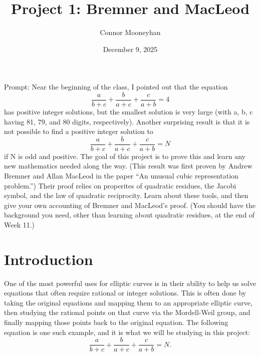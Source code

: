 \documentclass[12pt]{article}
\title{Project 1: Bremner and MacLeod}
\author{Connor Mooneyhan}
\date{December 9, 2025}
\theoremstyle{definition}
\begin{document}
\maketitle

Prompt: Near the beginning of the class, I pointed out that the equation \begin{equation*}
	\frac{a}{b+c}+ \frac{b}{a+c} + \frac{c}{a+b} = 4
\end{equation*} has positive integer solutions, but the smallest solution is very large (with a, b, c having 81, 79, and 80 digits, respectively).
Another surprising result is that it is not possible to find a positive integer solution to \begin{equation*}
	\frac{a}{b+c}+ \frac{b}{a+c} + \frac{c}{a+b} = N
\end{equation*} if N is odd and positive.
The goal of this project is to prove this and learn any new mathematics needed along the way.
(This result was first proven by Andrew Bremner and Allan MacLeod in the paper ``An unusual cubic representation problem.'')
Their proof relies on properites of quadratic residues, the Jacobi symbol, and the law of quadratic reciprocity.
Learn about these tools, and then give your own accounting of Bremner and MacLeod’s proof.
(You should have the background you need, other than learning about quadratic residues, at the end of Week 11.)

\section{Introduction}
One of the most powerful uses for elliptic curves is in their ability to help us solve equations that often require rational or integer solutions.
This is often done by taking the original equations and mapping them to an appropriate elliptic curve, then studying the rational points on that curve via the Mordell-Weil group, and finally mapping those points back to the original equation.
The following equation is one such example, and it is what we will be studying in this project: \begin{equation}\label{1}
	\frac{a}{b+c}+ \frac{b}{a+c} + \frac{c}{a+b} = N.
\end{equation}
\end{document}
